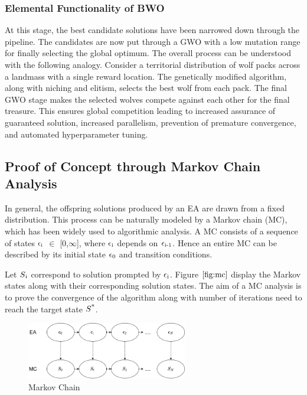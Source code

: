 \documentclass[conference]{IEEEtran}
\theoremstyle{definition}
\begin{document}
\subsubsection{Elemental Functionality of BWO}

At this stage, the best candidate solutions have been narrowed down through the pipeline. The candidates are now put through a GWO with a low mutation range for finally selecting the global optimum. The overall process can be understood with the following analogy. Consider a territorial distribution of wolf packs across a landmass with a single reward location. The genetically modified algorithm, along with niching and elitism, selects the best wolf from each pack. The final GWO stage makes the selected wolves compete against each other for the final treasure. This ensures global competition leading to increased assurance of guaranteed solution, increased parallelism, prevention of premature convergence, and automated hyperparameter tuning.  


\subsection{Proof of Concept through Markov Chain Analysis}
In general, the offspring solutions produced by an EA are drawn from a fixed distribution. This process can be naturally modeled by a Markov chain (MC), which has been widely used to algorithmic analysis. A MC consists of a sequence of states $\epsilon\textsubscript{i}$ $\in$ {[0,$\infty$]}, where $\epsilon\textsubscript{i}$ depends on $\epsilon\textsubscript{i-1}$. Hence an entire MC can be described by its initial state $\epsilon\textsubscript{0}$ and transition conditions. 

Let $S\textsubscript{i}$ correspond to solution prompted by $\epsilon\textsubscript{i}$. Figure $\ref{fig:mc}$ display the Markov states along with their corresponding solution states. The aim of a MC analysis is to prove the convergence of the algorithm along with number of iterations need to reach the target state $S\textsuperscript{*}$. 

\begin{figure}[t]
\centering\includegraphics[width=7cm]{mc.png}
\caption{Markov Chain}
\label{fig:mc}    
\end{figure}
\end{document}
